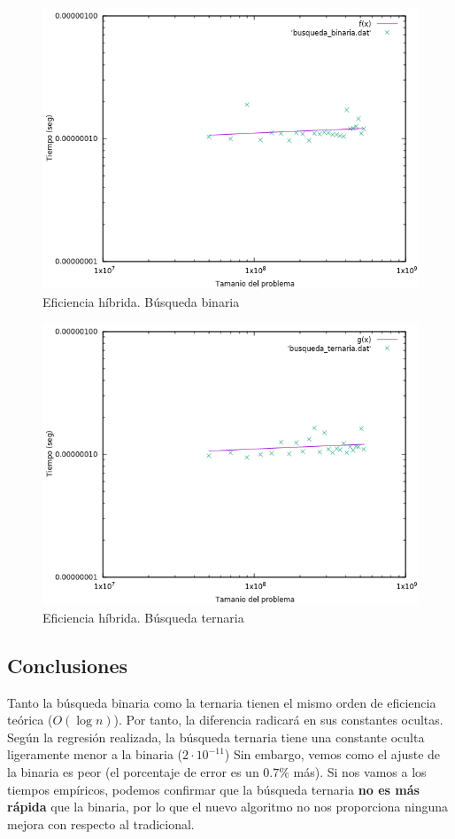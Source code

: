 \documentclass[12pt,spanish]{article}
\begin{document}
\begin{figure}[H]
\centering
\includegraphics[scale=0.75]{hibrida_binaria.png}
\caption{Eficiencia híbrida. Búsqueda binaria}
\end{figure}

\begin{figure}[H]
\centering
\includegraphics[scale=0.75]{hibrida_ternaria.png}
\caption{Eficiencia híbrida. Búsqueda ternaria}
\end{figure}

\newpage
\subsection{Conclusiones}
Tanto la búsqueda binaria como la ternaria tienen el mismo orden de eficiencia teórica ($O(\log n)$). Por tanto, la diferencia radicará en sus constantes ocultas. \\
Según la regresión realizada, la búsqueda ternaria tiene una constante oculta ligeramente menor a la binaria ($2 \cdot 10^{-11}$) Sin embargo, vemos como el ajuste de la binaria es peor (el porcentaje de error es un $0.7\%$ más). Si nos vamos a los tiempos empíricos, podemos confirmar que la búsqueda ternaria \textbf{no es más rápida} que la binaria, por lo que el nuevo algoritmo no nos proporciona ninguna mejora con respecto al tradicional.
\newpage
\end{document}
